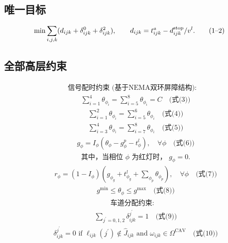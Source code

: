 \documentclass[UTF8,11pt]{ctexart}
\begin{document}
\subsection*{唯一目标}
\[
\min \sum_{i,j,k}(d_{ijk}+\delta^0_{ijk}+\delta^2_{ijk}),\qquad
d_{ijk}=t^a_{ijk}-d^{\rm stop}_{ijk}/v^l.\tag{1--2}
\]
\subsection*{全部高层约束}
\[\begin{aligned}&\text{信号配时约束 (基于NEMA双环屏障结构):}\end{aligned}\]
\[\begin{aligned}&\quad \sum_{i=1}^{4} \theta_{\phi_{i}} = \sum_{i=5}^{8} \theta_{\phi_{i}} = C \quad \text{(式(3))}\end{aligned}\]
\[\begin{aligned}&\quad \sum_{i=1}^{2} \theta_{\phi_{i}} = \sum_{i=5}^{6} \theta_{\phi_{i}} \quad \text{(式(4))}\end{aligned}\]
\[\begin{aligned}&\quad \sum_{i=3}^{4} \theta_{\phi_{i}} = \sum_{i=7}^{8} \theta_{\phi_{i}} \quad \text{(式(5))}\end{aligned}\]
\[\begin{aligned}&\quad g_{\phi} = I_{\phi} (\theta_{\phi} - g^{p}_{\phi} - t^{l}_{\phi}), \quad \forall \phi \quad \text{(式(6))}\end{aligned}\]
\[\begin{aligned}&\quad \text{其中，当相位 } \phi \text{ 为红灯时， } g_{\phi} = 0.\end{aligned}\]
\[\begin{aligned}&\quad r_{\phi} = (1 - I_{\phi})(g_{\phi_{g}} + t^{l}_{\phi_{g}} + \sum_{\phi_{p}} \theta_{\phi_{p}}), \quad \forall \phi \quad \text{(式(7))}\end{aligned}\]
\[\begin{aligned}&\quad g^{\min} \leq \theta_{\phi} \leq g^{\max} \quad \text{(式(8))}\end{aligned}\]
\[\begin{aligned}&\text{车道分配约束:}\end{aligned}\]
\[\begin{aligned}&\quad \sum_{j^{\prime}=0,1,2} \delta^{j^{\prime}}_{ijk} = 1 \quad \text{(式(9))}\end{aligned}\]
\[\begin{aligned}&\quad \delta^{j^{\prime}}_{ijk} = 0 \text{ if } \ell_{ijk}(j^{\prime}) \notin \widehat J_{ijk} \text{ and } \omega_{ijk} \in \Omega^{\text{CAV}} \quad \text{(式(10))}\end{aligned}\]
\end{document}
